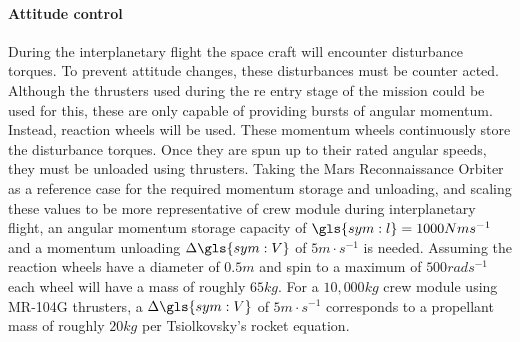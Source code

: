 \paragraph{Attitude control}
During the interplanetary flight the space craft will encounter disturbance torques. To prevent attitude changes, these disturbances must be counter acted. Although the thrusters used during the re entry stage of the mission could be used for this, these are only capable of providing bursts of angular momentum. Instead, reaction wheels will be used. These momentum wheels continuously store the disturbance torques. Once they are spun up to their rated angular speeds, they must be unloaded using thrusters. Taking the Mars Reconnaissance Orbiter \cite{You2007} as a reference case for the required momentum storage and unloading, and scaling these values to be more representative of crew module during interplanetary flight, an angular momentum storage capacity of $\gls{sym:l} = 1000 Nms^{-1} $ and a momentum unloading $\Delta \gls{sym:V}$ of $5 m\cdot s^{-1}$ is needed. Assuming the reaction wheels have a diameter of $0.5 m$ and spin to a maximum of $500 rads^{-1}$ each wheel will have a mass of roughly $65 kg$. For a $10,000kg$ crew module using MR-104G thrusters, a $\Delta \gls{sym:V}$ of $5 m\cdot s^{-1}$ corresponds to a propellant mass of roughly $20kg$ per Tsiolkovsky's rocket equation. 
